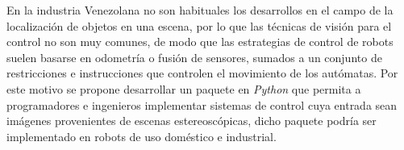 En la industria Venezolana no son habituales los desarrollos en el campo de la localización de objetos en una escena, por lo que las técnicas de visión para el control no son muy comunes, de modo que las estrategias de control de robots suelen basarse en odometría o fusión de sensores, sumados a un conjunto de restricciones e instrucciones que controlen el movimiento de los autómatas. Por este motivo se propone desarrollar un paquete en \textit{Python} que permita a programadores e ingenieros implementar sistemas de control cuya entrada sean imágenes provenientes de escenas estereoscópicas, dicho paquete podría ser implementado en robots de uso doméstico e industrial.